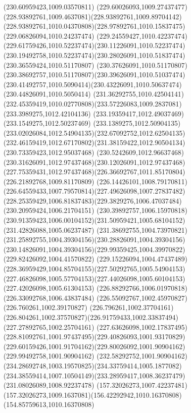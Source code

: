 {{\lineto(230.60959423,1009.03570811)
\curveto(229.60026093,1009.27437477)(228.93892761,1009.4637081)(228.93892761,1009.89704142)
\curveto(228.93892761,1010.04370808)(228.97892761,1010.15837475)(229.06826094,1010.24237474)
\curveto(229.24559427,1010.42237474)(229.61759426,1010.52237474)(230.11226091,1010.52237474)
\curveto(230.19492758,1010.52237474)(230.28026091,1010.51837474)(230.36559424,1010.51170807)
\curveto(230.37626091,1010.51170807)(230.38692757,1010.51170807)(230.39626091,1010.51037474)
\curveto(230.41492757,1010.5090414)(230.43226091,1010.50637474)(230.44826091,1010.5050414)
\curveto(231.36292755,1010.42504141)(232.45359419,1010.02770808)(233.57226083,1009.2837081)
\lineto(233.3989275,1012.42104136)
\lineto(233.19359417,1012.49037469)
\lineto(233.1549275,1012.50237469)
\curveto(233.1389275,1012.50904135)(233.02026084,1012.54904135)(232.67092752,1012.62504135)
\curveto(232.46159419,1012.67170802)(231.38159422,1012.90504134)(230.73359423,1012.95037468)
\curveto(230.5242609,1012.96637468)(230.31626091,1012.97437468)(230.12026091,1012.97437468)
\curveto(227.75359431,1012.97437468)(226.36692767,1011.85170804)(226.21892768,1009.81170809)
\curveto(226.14426101,1008.79170811)(226.64559433,1007.79570814)(227.49626098,1007.27837482)
\curveto(228.25359429,1006.81837483)(229.3829276,1006.47037484)(230.20959424,1006.21704151)
\lineto(230.39892757,1006.15970818)
\curveto(230.91359423,1006.00104152)(231.50959421,1005.68104152)(231.42826088,1005.06237487)
\curveto(231.38692755,1004.73970821)(231.25892755,1004.39304156)(230.28826091,1004.39304156)
\curveto(230.14826091,1004.39304156)(229.99359425,1004.39970822)(229.82426092,1004.41570822)
\curveto(229.15226094,1004.47437489)(228.36959429,1004.85704155)(227.50292765,1005.54904153)
\curveto(227.46826098,1005.57704153)(227.44026098,1005.60104153)(227.42026098,1005.61304153)
\lineto(226.88292766,1006.01970818)
\lineto(226.33092768,1006.43837484)
\lineto(226.55092767,1002.45970827)
\lineto(226.760261,1002.39170827)
\lineto(226.796261,1002.37704161)
\curveto(226.804261,1002.37570827)(226.91759433,1002.33837494)(227.27892765,1002.25704161)
\curveto(227.63626098,1002.17837495)(228.81092761,1001.97437495)(229.40826093,1001.93170829)
\curveto(229.60159426,1001.91704162)(229.80026092,1001.90904162)(229.99492758,1001.90904162)
\curveto(232.58292752,1001.90904162)(234.28692748,1003.19570825)(234.33759414,1005.1877082)
\curveto(234.38559414,1007.10504149)(233.28959417,1008.36237479)(231.08026089,1008.92237478)
\moveto(157.32026273,1007.42237481)
\curveto(157.32026273,1009.1637081)(156.42292942,1010.16370808)(154.85759613,1010.16370808)
}}
